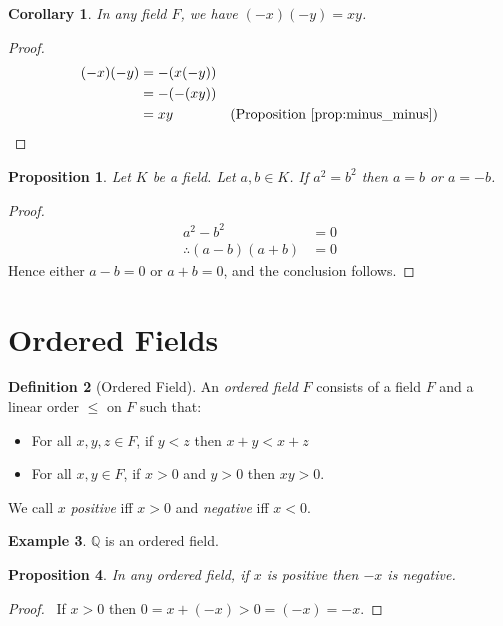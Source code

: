 \documentclass{book}
\let\qed\relax
\newtheorem{prop}{Proposition}[chapter]
\newtheorem{cor}{Corollary}[prop]
\theoremstyle{definition}
\newtheorem{df}[prop]{Definition}
\newtheorem{ex}[prop]{Example}
\begin{document}
\begin{cor}
In any field $F$, we have $(-x)(-y) = xy$.
\end{cor}

\begin{proof}
\pf
\begin{align*}
(-x)(-y) & = -(x(-y)) \\
& = -(-(xy)) \\
& = xy & (\text{Proposition \ref{prop:minus_minus}}) \qed
\end{align*}
\end{proof}

\begin{prop}
\label{prop:at_most_two_square_roots}
Let $K$ be a field. Let $a,b \in K$. If $a^2 = b^2$ then $a = b$ or $a = -b$.
\end{prop}

\begin{proof}
\pf
\begin{align*}
a^2 - b^2 & = 0 \\
\therefore (a-b)(a+b) & = 0
\end{align*}
Hence either $a - b = 0$ or $a + b = 0$, and the conclusion follows. \qed
\end{proof}

\section{Ordered Fields}

\begin{df}[Ordered Field]
An \emph{ordered field} $F$ consists of a field $F$ and a linear order $\leq$ on $F$ such that:
\begin{itemize}
\item For all $x,y,z \in F$, if $y < z$ then $x + y < x + z$
\item For all $x,y \in F$, if $x > 0$ and $y > 0$ then $xy > 0$.
\end{itemize}
We call $x$ \emph{positive} iff $x > 0$ and \emph{negative} iff $x < 0$.
\end{df}

\begin{ex}
$\mathbb{Q}$ is an ordered field. %
\end{ex}

\begin{prop}
In any ordered field, if $x$ is positive then $-x$ is negative.
\end{prop}

\begin{proof}
\pf\ If $x > 0$ then $0 = x + (-x) > 0 = (-x) = -x$. \qed
\end{proof}
\end{document}
